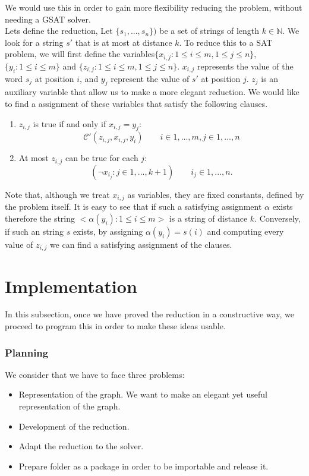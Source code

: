 We would use this in order to gain more flexibility reducing the problem, without needing a GSAT solver.\\

Lets define the reduction, Let $\{s_1,...,s_n\})$ be a set of strings of length $k \in \mathbb{N}$. We look for a string $s'$ that is at most at distance $k$. To reduce this to a SAT problem, we will first define the variables$ \{ x_{i,j} : 1 \le i \le m, 1 \le j \le n \}$, $\{y_i : 1 \le i \le m\}$ and $\{z_{i,j} : 1\le i \le m, 1 \le j \le n\}$. $x_{i,j}$ represents the value of the word $s_j$ at position $i$, and $y_j$ represent the value of $s'$ at position $j$. $z_j$ is an auxiliary variable that allow us to make a more elegant reduction. We would like to find a assignment of these variables that satisfy the following clauses.

\begin{enumerate}
\item $z_{i,j}$ is true if and only if $x_{i,j} = y_j$:
  $$\mathcal{C'} (z_{i,j},x_{i,j},y_i)  \qquad i \in 1,...,m, j \in 1,...,n$$
\item At most $z_{i,j}$ can be true for each $j$:
    $$(\neg x_{i_j} : j\in 1,...,k +1 ) \qquad  i_j \in 1,...,n.$$
\end{enumerate}

Note that, although we treat $x_{i,j}$ as variables, they are fixed constants, defined by the problem itself. It is easy to see that if such a satisfying assignment $\alpha$ exists therefore the string $<\alpha(y_i) : 1 \le i \le m>$ is a string of distance $k$. Conversely, if such an string $s$ exists, by assigning $\alpha(y_i) = s(i)$ and computing every value of $z_{i,j} $ we can find a satisfying assignment of the clauses.

\section{Implementation}

In this subsection, once we have proved the reduction in a constructive way, we proceed to program this in order to make these ideas usable.

\subsubsection{Planning}

We consider that we have to face three problems:
\begin{itemize}
\item Representation of the graph. We want to make an elegant yet useful representation of the graph. 
\item Development of the reduction.
\item Adapt the reduction to the solver.
\item Prepare folder as a package in order to be importable and release it.
\end{itemize}



